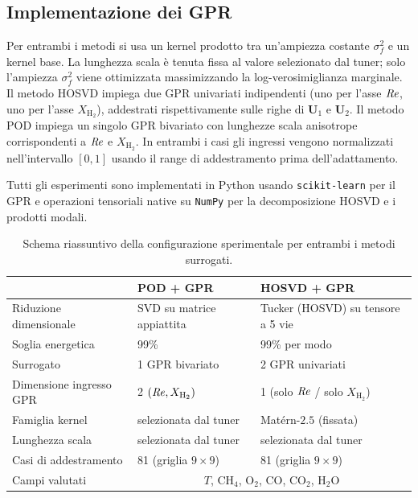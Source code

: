 \subsection{Implementazione dei GPR}

Per entrambi i metodi si usa un kernel prodotto tra un'ampiezza costante $\sigma_f^2$ e un kernel base. La lunghezza scala è tenuta fissa al valore selezionato dal tuner; solo l'ampiezza $\sigma_f^2$ viene ottimizzata massimizzando la log-verosimiglianza marginale. Il metodo HOSVD impiega due GPR univariati indipendenti (uno per l'asse $\mathit{Re}$, uno per l'asse $X_{\mathrm{H_2}}$), addestrati rispettivamente sulle righe di $\mathbf{U}_1$ e $\mathbf{U}_2$. Il metodo POD impiega un singolo GPR bivariato con lunghezze scala anisotrope corrispondenti a $\mathit{Re}$ e $X_{\mathrm{H_2}}$. In entrambi i casi gli ingressi vengono normalizzati nell'intervallo $[0,1]$ usando il range di addestramento prima dell'adattamento.

Tutti gli esperimenti sono implementati in Python usando \texttt{scikit-learn} per il GPR e operazioni tensoriali native su \texttt{NumPy} per la decomposizione HOSVD e i prodotti modali.

\begin{table}[htbp]
\caption{Schema riassuntivo della configurazione sperimentale per entrambi i metodi surrogati.}
\label{tab:setup}
\centering
\begin{tabular}{lll}
\hline
 & \textbf{POD + GPR} & \textbf{HOSVD + GPR} \\
\hline
Riduzione dimensionale & SVD su matrice appiattita & Tucker (HOSVD) su tensore a 5 vie \\
Soglia energetica & 99\% & 99\% per modo \\
Surrogato & 1 GPR bivariato & 2 GPR univariati \\
Dimensione ingresso GPR & 2 $(\mathit{Re}, X_{\mathrm{H_2}})$ & 1 (solo $\mathit{Re}$ / solo $X_{\mathrm{H_2}}$) \\
Famiglia kernel & selezionata dal tuner & Matérn-$2.5$ (fissata) \\
Lunghezza scala & selezionata dal tuner & selezionata dal tuner \\
Casi di addestramento & 81 (griglia $9\times9$) & 81 (griglia $9\times9$) \\
Campi valutati & \multicolumn{2}{c}{$T$, CH$_4$, O$_2$, CO, CO$_2$, H$_2$O} \\
\hline
\end{tabular}
\end{table}
